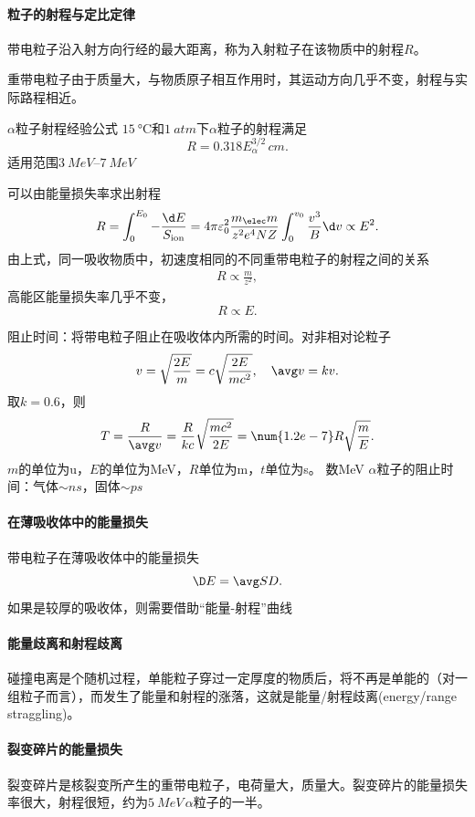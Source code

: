 \paragraph{粒子的射程与定比定律}带电粒子沿入射方向行经的最大距离，称为入射粒子在该物质中的射程$R$。

重带电粒子由于质量大，与物质原子相互作用时，其运动方向几乎不变，射程与实际路程相近。

\begin{example}{$\alpha$粒子射程经验公式}{}
	$\SI{15}{\celsius}$和$\SI{1}{atm}$下$\alpha$粒子的射程满足
	\[
		R=0.318E_\alpha^{3/2}\,\si{cm}.
	\]
	适用范围$\SIrange{3}{7}{MeV}$
\end{example}
可以由能量损失率求出射程
\begin{align}
	R=\int_0^{E_0}-\frac{\d E}{S_{\mathrm{ion}}}=4\pi\varepsilon_0^2\frac{m_\elec m}{z^2e^4NZ}\int_0^{v_0}\frac{v^3}B\d v\propto E^2.
\end{align}
由上式，同一吸收物质中，初速度相同的不同重带电粒子的射程之间的关系
\begin{align}
	R\propto\frac{m}{z^2},%
\end{align}
高能区能量损失率几乎不变，
\[
	R\propto E.
\]



阻止时间：将带电粒子阻止在吸收体内所需的时间。对非相对论粒子
\[
	v=\sqrt{\frac{2E}{m}}=c\sqrt{\frac{2E}{mc^2}},\quad\avg v=kv.
\]
取$k=0.6$，则
\[
	T=\frac{R}{\avg v}=\frac{R}{kc}\sqrt{\frac{mc^2}{2E}}=\num{1.2e-7}R\sqrt{\frac{m}E}.
\]
$m$的单位为u，$E$的单位为MeV，$R$单位为m，$t$单位为s。
数MeV $\alpha$粒子的阻止时间：气体$\sim\si{ns}$，固体$\sim\si{ps}$
\paragraph{在薄吸收体中的能量损失}
带电粒子在薄吸收体中的能量损失
\[
	\D E=\avg SD.
\]
如果是较厚的吸收体，则需要借助“能量-射程”曲线
\paragraph{能量歧离和射程歧离}
碰撞电离是个随机过程，单能粒子穿过一定厚度的物质后，将不再是单能的（对一组粒子而言），而发生了能量和射程的涨落，这就是能量/射程歧离(energy/range straggling)。
\paragraph{裂变碎片的能量损失}
裂变碎片是核裂变所产生的重带电粒子，电荷量大，质量大。裂变碎片的能量损失率很大，射程很短，约为$\SI{5}{MeV}\,\alpha$粒子的一半。

